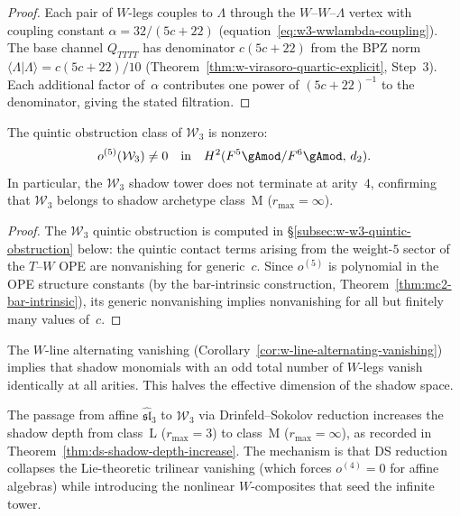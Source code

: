 \begin{proof}
Each pair of $W$-legs couples to $\Lambda$ through the
$W$--$W$--$\Lambda$ vertex with coupling constant
$\alpha = 32/(5c+22)$
(equation~\eqref{eq:w3-wwlambda-coupling}).
The base channel $Q_{TTTT}$ has denominator $c(5c+22)$
from the BPZ norm $\langle\Lambda|\Lambda\rangle = c(5c+22)/10$
(Theorem~\ref{thm:w-virasoro-quartic-explicit}, Step~3).
Each additional factor of~$\alpha$ contributes one power
of $(5c+22)^{-1}$ to the denominator, giving the stated
filtration.
\end{proof}

\begin{theorem}
\label{thm:w3-quintic-nonvanishing}
The quintic obstruction class of $\mathcal{W}_3$ is nonzero:
\begin{equation}
\label{eq:w3-quintic-nonvanishing}
o^{(5)}(\mathcal{W}_3) \neq 0
\quad\text{in}\quad
H^2(F^5\gAmod/F^6\gAmod,\,d_2).
\end{equation}
In particular, the $\mathcal{W}_3$ shadow tower does not terminate at
arity~$4$, confirming that $\mathcal{W}_3$ belongs to shadow archetype
class~M \textup{(}$r_{\max} = \infty$\textup{)}.
\end{theorem}

\begin{proof}
The $\mathcal{W}_3$ quintic obstruction is computed in
\S\ref{subsec:w-w3-quintic-obstruction} below: the quintic
contact terms arising from the weight-$5$ sector of the $T$--$W$
OPE are nonvanishing for generic~$c$.  Since $o^{(5)}$ is polynomial
in the OPE structure constants (by the bar-intrinsic construction,
Theorem~\ref{thm:mc2-bar-intrinsic}), its generic nonvanishing
implies nonvanishing for all but finitely many values of~$c$.
\end{proof}

\begin{remark}
\label{rem:w3-alternating-vanishing-ds}
The $W$-line alternating vanishing
(Corollary~\ref{cor:w-line-alternating-vanishing}) implies that
shadow monomials with an odd total number of $W$-legs vanish
identically at all arities.  This halves the effective dimension
of the shadow space.

The passage from affine $\widehat{\mathfrak{sl}}_3$ to
$\mathcal{W}_3$ via Drinfeld--Sokolov reduction increases the
shadow depth from class~L ($r_{\max} = 3$) to class~M
($r_{\max} = \infty$), as recorded in
Theorem~\ref{thm:ds-shadow-depth-increase}.  The mechanism is
that DS reduction collapses the Lie-theoretic trilinear vanishing
(which forces $o^{(4)} = 0$ for affine algebras) while introducing
the nonlinear $W$-composites that seed the infinite tower.
\end{remark}

